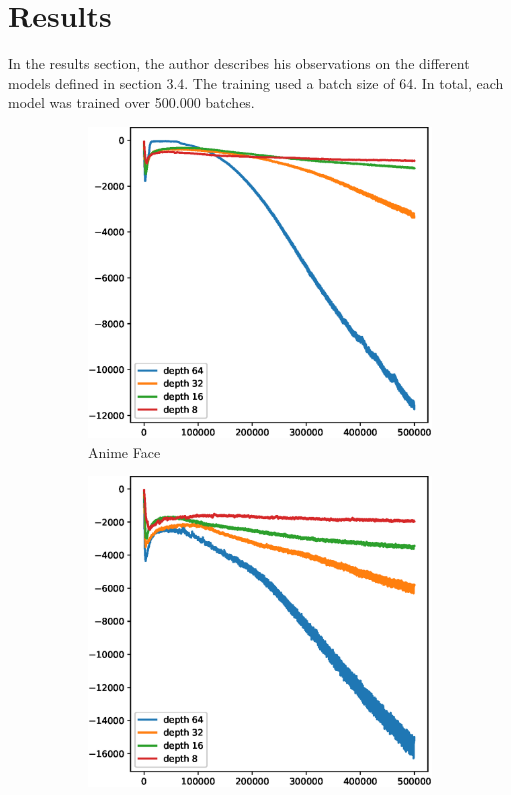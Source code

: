 
\section{Results}

In the results section, the author describes his observations on the different models defined in section 3.4. The training used a batch size of 64. In total, each model was trained over 500.000 batches. \\

\begin{figure}[H]
    \centering
    \begin{subfigure}[b]{0.45\textwidth}
        \centering
        \includegraphics[width=\textwidth]{resources/images/celeba_hq_d_loss.eps}
        \caption{Anime Face}
        \label{fig:celeba_hq_d_loss}
    \end{subfigure}
    \hfill
    \begin{subfigure}[b]{0.45\textwidth}
        \centering
        \includegraphics[width=\textwidth]{resources/images/anime_face_d_loss.eps}

\end{subfigure}
\end{figure}
